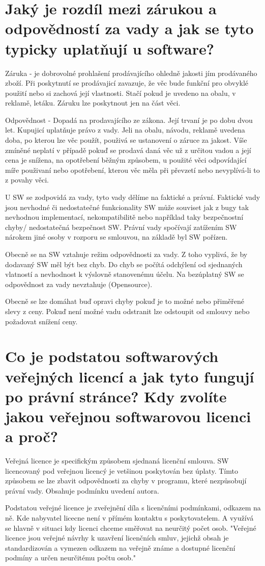 \documentclass[12pt,a4paper,czech]{article}
\newcommand{\nadpis}[1]{{\section{#1}}}
\begin{document}
\newpage
\nadpis{Jaký je rozdíl mezi zárukou a odpovědností za vady a jak se tyto typicky uplatňují u software?}

Záruka - je dobrovolné prohlašení prodávajícího ohledně jakosti jím prodávaného zboží. Při poskytnutí se prodávajicí zavazuje, že věc bude funkční pro obvyklé použití nebo si zachová její vlastnosti. Stačí pokud je uvedeno na obalu, v reklamě, letáku. Záruku lze poskytnout jen na část věci.

Odpovědnost - Dopadá na prodavajícího ze zákona. Její trvaní je po dobu dvou let. Kupujicí uplatňuje právo z vady. Jeli na obalu, návodu, reklamě uvedena doba, po kterou lze věc použít, použivá se ustanovení o záruce za jakost. Víše zmíněné neplatí v případě pokuď se prodavá daná věc už z určitou vadou a její cena je snížena, na opotřebení běžným způsobem, u použité věci odpovídající míře použivaní nebo opotřebení, kterou věc měla při převzetí nebo nevyplívá-li to z povahy věci.

U SW se zodpovidá za vady,  tyto vady dělíme na faktické a právní. Faktické vady jsou nevhodné či nedostatečné funkcionality SW může souviset jak z bugy tak nevhodnou implementací, nekompatibilitě nebo například taky bezpečnostní chyby/ nedostatečná bezpečnost SW. Právní vady spočívají zatížením SW nárokem jiné osoby v rozporu se smlouvou, na základě byl SW pořízen. 

Obecně se na SW vztahuje režim odpovědnosti za vady. Z toho vyplivá, že by dodavaný SW měl být bez chyb. Do chyb se počítá odchýlení od sjednaných vlatností a nevhodnost k výslovně stanovenému účelu. Na bezúplatný SW se odpovědnost za vady nevztahuje (Opensource). 

Obecně se lze domáhat buď opravi chyby pokuď je to možné nebo přiměřené slevy z ceny. Pokuď není možné vadu odstranit lze odstoupit od smlouvy nebo požadovat snížení ceny. 


\vspace{0.5cm} 
\nadpis{Co je podstatou softwarových veřejných licencí a jak tyto fungují po právní stránce? Kdy zvolíte jakou veřejnou softwarovou licenci a proč?}

Veřejná licence je specifickým způsobem sjednaná licenční smlouva. SW licencovaný pod veřejnou licencý je vetšinou poskytován bez úplaty. Tímto způsobem se lze zbavit odpovědnosti za chyby v programu, které nezpůsobují právní vady. Obsahuje podmínku uvedení autora. 

Podstatou veřejné licence je zveřejnění díla s licenčními podmínkami, odkazem na ně. Kde nabyvatel licecne není v přímém kontaktu s poskytovatelem. A využívá se hlavně v situaci kdy licenci chceme směřovat na neurčitý počet osob.
"Veřejné licence jsou veřejné návrhy k uzavření licenčních smluv, jejichž obsah je standardizován a vymezen odkazem na veřejně známe a dostupné licenční podmíny a určen neurčitému počtu osob."
\end{document}
